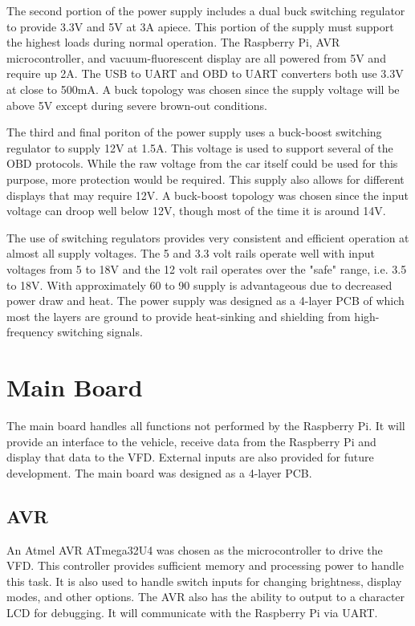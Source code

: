 The second portion of the power supply includes a dual buck switching regulator
to provide 3.3V and 5V at 3A apiece.  This portion of the supply must support 
the highest loads during normal operation.  The Raspberry Pi, AVR 
microcontroller, and vacuum-fluorescent display are all powered from 5V and 
require up 2A.  The USB to UART and OBD to UART converters both use 3.3V at 
close to 500mA.  A buck topology was chosen since the supply voltage will be
above 5V except during severe brown-out conditions.

The third and final poriton of the power supply uses a buck-boost switching
regulator to supply 12V at 1.5A.  This voltage is used to support several
of the OBD protocols.  While the raw voltage from the car itself could be used
for this purpose, more protection would be required.  This supply also allows
for different displays that may require 12V.  A buck-boost topology was chosen
since the input voltage can droop well below 12V, though most of the time it is
around 14V.

The use of switching regulators provides very consistent and efficient operation
at almost all supply voltages.  The 5 and 3.3 volt rails operate well with input
voltages from 5 to 18V and the 12 volt rail operates over the "safe" range, i.e.
3.5 to 18V.  With approximately 60%
to 90%
supply is advantageous due to decreased power draw and heat.  The power supply was
designed as a 4-layer PCB of which most the layers are ground to provide 
heat-sinking and shielding from high-frequency switching signals.

\section{Main Board}
The main board handles all functions not performed by the Raspberry Pi.  It will
provide an interface to the vehicle, receive data from the Raspberry Pi and 
display that data to the VFD.  External inputs are also provided for future 
development.  The main board was designed as a 4-layer PCB.

\subsection{AVR}
An Atmel AVR ATmega32U4 was chosen as the microcontroller to drive the VFD.  This
controller provides sufficient memory and processing power to handle this task. 
It is also used to handle switch inputs for changing brightness, display modes,
and other options.  The AVR also has the ability to output to a character LCD
for debugging.  It will communicate with the Raspberry Pi via UART.

